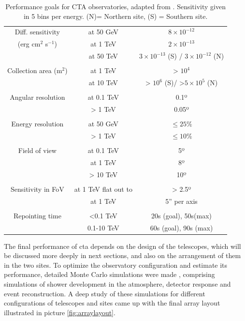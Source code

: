 \documentclass[main.tex]{subfiles}
\begin{document}
\begin{table}[h]
  \centering
  \begin{tabular}{ccc}
    \hline
    Diff. sensitivity & at 50 GeV & $8\times10^{-12}$\\
    (erg cm$^2$ s$^{-1}$) & at 1 TeV & $2\times10^{-13}$\\
     & at 50 TeV & $3\times10^{-13}$ (S) / $3\times10^{-12}$ (N)\\\\
    Collection area (m$^{2}$) & at 1 TeV & > $10^4$ \\
    & at 10 TeV & > $10^6$ (S)/ >$5\times10^5$ (N) \\\\
    Angular resolution & at 0.1 TeV & 0.1º \\
    & > 1 TeV & 0.05º \\\\
    Energy resolution & at 50 GeV & $\le 25\%$ \\
    & > 1 TeV & $\le 10\%$ \\\\
    Field of view & at 0.1 TeV & 5º\\
    & at 1 TeV & 8º\\
    & > 10 TeV & 10º\\\\
    Sensitivity in FoV & at 1 TeV flat out to & > 2.5º \\
    & at 1 TeV & 5'' per axis \\\\
    Repointing time & <0.1 TeV  & 20s (goal), 50s(max) \\
    & 0.1-10 TeV & 60s (goal), 90s (max) \\
    \hline
  \end{tabular}
  \caption{Performance goals for CTA observatories, adapted from \cite{CTAconcept}. Sensitivity given in 5 bins per energy. (N)= Northern site, (S) = Southern site.}
  \label{tab:CTAgoals}
\end{table}

The final performance of \gls{cta} depends on the design of the telescopes, which will be discussed more deeply in next sections, and also on the arrangement of them in the two sites.
To optimize the observatory configuration and estimate its performance,  detailed Monte Carlo simulations were made \cite{2013CTAMonteCarlo}, comprising simulations of shower development in the atmosphere, detector response and event reconstruction.
A deep study of these simulations \cite{2017CTAMCPerformance} for different configurations of telescopes and sites came up with the final array layout illustrated in picture \ref{fig:arraylayout}.
\end{document}
